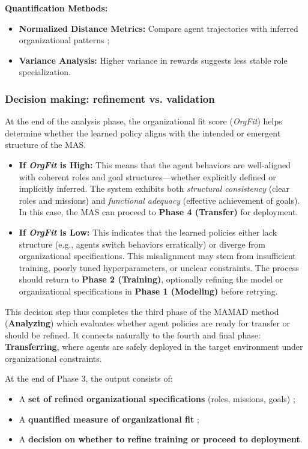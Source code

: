 \documentclass[pdflatex,sn-mathphys-num]{sn-jnl}%
\theoremstyle{thmstyleone}%
\theoremstyle{thmstyletwo}%
\theoremstyle{thmstylethree}%
\begin{document}
\noindent \textbf{Quantification Methods:}
\begin{itemize}
    \item \textbf{Normalized Distance Metrics:} Compare agent trajectories with inferred organizational patterns ;
    \item \textbf{Variance Analysis:} Higher variance in rewards suggests less stable role specialization.
\end{itemize}

\subsubsection{Decision making: refinement vs. validation}

At the end of the analysis phase, the organizational fit score (\textit{OrgFit}) helps determine whether the learned policy aligns with the intended or emergent structure of the MAS.

\begin{itemize}
    \item \textbf{If \textit{OrgFit} is High:} This means that the agent behaviors are well-aligned with coherent roles and goal structures—whether explicitly defined or implicitly inferred. The system exhibits both \textit{structural consistency} (clear roles and missions) and \textit{functional adequacy} (effective achievement of goals). In this case, the MAS can proceed to \textbf{Phase 4 (Transfer)} for deployment.
          
    \item \textbf{If \textit{OrgFit} is Low:} This indicates that the learned policies either lack structure (e.g., agents switch behaviors erratically) or diverge from organizational specifications. This misalignment may stem from insufficient training, poorly tuned hyperparameters, or unclear constraints. The process should return to \textbf{Phase 2 (Training)}, optionally refining the model or organizational specifications in \textbf{Phase 1 (Modeling)} before retrying.
\end{itemize}

\noindent This decision step thus completes the third phase of the MAMAD method (\textbf{Analyzing}) which evaluates whether agent policies are ready for transfer or should be refined. It connects naturally to the fourth and final phase: \textbf{Transferring}, where agents are safely deployed in the target environment under organizational constraints.

At the end of Phase 3, the output consists of:
\begin{itemize}
    \item A \textbf{set of refined organizational specifications} (roles, missions, goals) ;
    \item A \textbf{quantified measure of organizational fit} ;
    \item A \textbf{decision on whether to refine training or proceed to deployment}.
\end{itemize}
\end{document}
